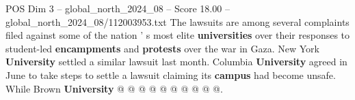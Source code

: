 \begin{textsample}{POS Dim 3 – global\_north\_2024\_08 – Score 18.00 – global\_north\_2024\_08/112003953.txt}
The lawsuits are among several complaints filed against some of the nation ' s most elite \textbf{universities} over their responses to student-led \textbf{encampments} and \textbf{protests} over the war in Gaza.
New York \textbf{University} settled a similar lawsuit last month.
Columbia \textbf{University} agreed in June to take steps to settle a lawsuit claiming its \textbf{campus} had become unsafe.
While Brown \textbf{University} @ @ @ @ @ @ @ @ @ @.

\end{textsample}

